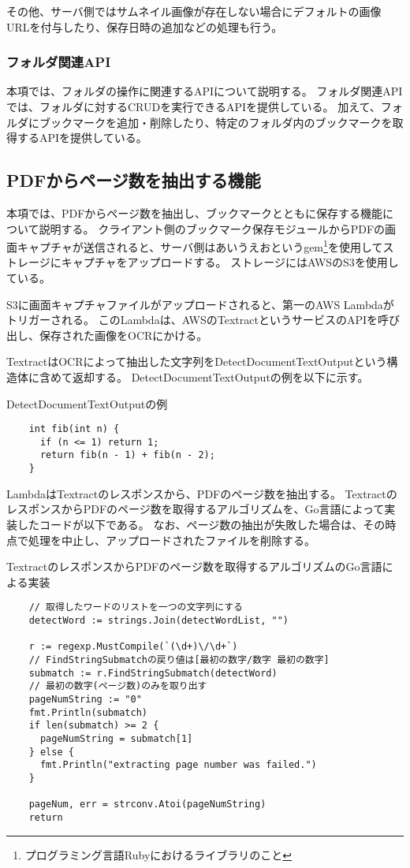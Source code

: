 その他、サーバ側ではサムネイル画像が存在しない場合にデフォルトの画像URLを付与したり、保存日時の追加などの処理も行う。

\subsubsection{フォルダ関連API}
本項では、フォルダの操作に関連するAPIについて説明する。
フォルダ関連APIでは、フォルダに対するCRUDを実行できるAPIを提供している。
加えて、フォルダにブックマークを追加・削除したり、特定のフォルダ内のブックマークを取得するAPIを提供している。

\subsection{PDFからページ数を抽出する機能}
本項では、PDFからページ数を抽出し、ブックマークとともに保存する機能について説明する。
クライアント側のブックマーク保存モジュールからPDFの画面キャプチャが送信されると、サーバ側はあいうえおというgem\footnote{プログラミング言語Rubyにおけるライブラリのこと}を使用してストレージにキャプチャをアップロードする。
ストレージにはAWSのS3\cite{}を使用している。

S3に画面キャプチャファイルがアップロードされると、第一のAWS Lambdaがトリガーされる。
このLambdaは、AWSのTextract\cite{}というサービスのAPIを呼び出し、保存された画像をOCRにかける。

TextractはOCRによって抽出した文字列をDetectDocumentTextOutputという構造体に含めて返却する。
DetectDocumentTextOutputの例を以下に示す。

\begin{itembox}[l]{DetectDocumentTextOutputの例}
  \begin{verbatim}
    int fib(int n) {
      if (n <= 1) return 1;
      return fib(n - 1) + fib(n - 2);
    }
  \end{verbatim}
\end{itembox}

LambdaはTextractのレスポンスから、PDFのページ数を抽出する。
TextractのレスポンスからPDFのページ数を取得するアルゴリズムを、Go言語によって実装したコードが以下である。
なお、ページ数の抽出が失敗した場合は、その時点で処理を中止し、アップロードされたファイルを削除する。

\begin{itembox}[l]{TextractのレスポンスからPDFのページ数を取得するアルゴリズムのGo言語による実装}
  \begin{verbatim}
    // 取得したワードのリストを一つの文字列にする
    detectWord := strings.Join(detectWordList, "")

    r := regexp.MustCompile(`(\d+)\/\d+`)
    // FindStringSubmatchの戻り値は[最初の数字/数字 最初の数字]
    submatch := r.FindStringSubmatch(detectWord)
    // 最初の数字(ページ数)のみを取り出す
    pageNumString := "0"
    fmt.Println(submatch)
    if len(submatch) >= 2 {
      pageNumString = submatch[1]
    } else {
      fmt.Println("extracting page number was failed.")
    }

    pageNum, err = strconv.Atoi(pageNumString)
    return
  \end{verbatim}
\end{itembox}

